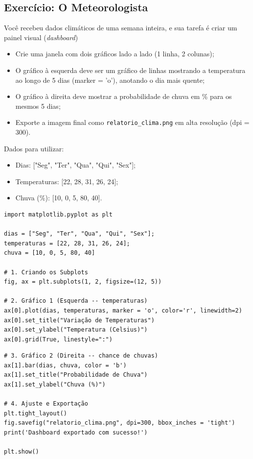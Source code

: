 \documentclass[../numerical_methods.tex]{subfiles}
\begin{document}
\subsection{Exercício: O Meteorologista}
Você recebeu dados climáticos de uma semana inteira, e sua tarefa é criar um painel visual (\textit{dashboard})
\begin{itemize}
	\item[1)] Crie uma janela com dois gráficos lado a lado (1 linha, 2 colunas);
	\item[2)] O gráfico à esquerda deve ser um gráfico de linhas mostrando a temperatura ao longo de 5 dias (marker = 'o'), anotando o dia mais quente;
	\item[3)] O gráfico à direita deve mostrar a probabilidade de chuva em \% para os mesmos 5 dias;
	\item[4)] Exporte a imagem final como \texttt{relatorio\_clima.png} em alta resolução (dpi = 300).
\end{itemize}
Dados para utilizar:
\begin{itemize}
	\item Dias: ["Seg", "Ter", "Qua", "Qui", "Sex"];
	\item Temperaturas: [22, 28, 31, 26, 24];
	\item Chuva (\%): [10, 0, 5, 80, 40].
\end{itemize}

\begin{listing}[H]
	\caption{Pedidos de um Meteorologista}
	\begin{verbatim}
import matplotlib.pyplot as plt

dias = ["Seg", "Ter", "Qua", "Qui", "Sex"]; 
temperaturas = [22, 28, 31, 26, 24];
chuva = [10, 0, 5, 80, 40]

# 1. Criando os Subplots 
fig, ax = plt.subplots(1, 2, figsize=(12, 5))

# 2. Gráfico 1 (Esquerda -- temperaturas)
ax[0].plot(dias, temperaturas, marker = 'o', color='r', linewidth=2)
ax[0].set_title("Variação de Temperaturas")
ax[0].set_ylabel("Temperatura (Celsius)")
ax[0].grid(True, linestyle=":")

\end{verbatim}
\end{listing}

\begin{listing}[H]
	\begin{verbatim}
# 3. Gráfico 2 (Direita -- chance de chuvas)
ax[1].bar(dias, chuva, color = 'b')
ax[1].set_title("Probabilidade de Chuva")
ax[1].set_ylabel("Chuva (%)")

# 4. Ajuste e Exportação 
plt.tight_layout()
fig.savefig("relatorio_clima.png", dpi=300, bbox_inches = 'tight')
print('Dashboard exportado com sucesso!')

plt.show()
\end{verbatim}
\end{listing}
\end{document}
